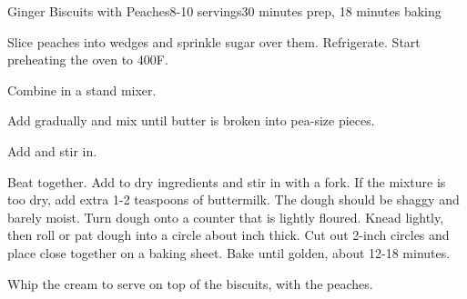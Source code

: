 \documentclass[../Cookbook.tex]{subfiles}
\begin{document}
\begin{recipe}{Ginger Biscuits with Peaches}{8-10 servings}{30 minutes prep, 18 minutes baking}

Slice peaches into wedges and sprinkle sugar over them. Refrigerate.
Start preheating the oven to 400\0F.

Combine in a stand mixer.

Add gradually and mix until butter is broken into pea-size pieces.

Add and stir in.

Beat together. Add to dry ingredients and stir in with a fork. If the mixture is too dry, add extra 1-2 teaspoons of buttermilk. The dough should be shaggy and barely moist.
Turn dough onto a counter that is lightly floured. Knead lightly, then roll or pat dough into a circle about  inch thick. Cut out 2-inch circles and place close together on a baking sheet. Bake until golden, about 12-18 minutes.

Whip the cream to serve on top of the biscuits, with the peaches.

\end{recipe}
\end{document}
